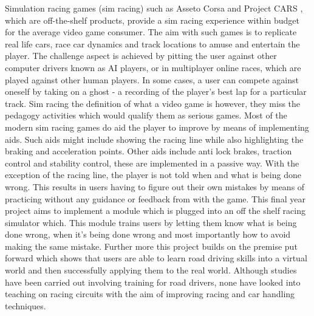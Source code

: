 Simulation racing games (sim racing) such as Asseto Corsa \cite{assestoCorsa} and Project CARS \cite{ProjectCars} , which are off-the-shelf products, provide a sim racing experience within budget for the average video game consumer. The aim with such games is to replicate real life cars, race car dynamics and track locations to amuse and entertain the player. The challenge aspect is achieved by pitting the user against other computer drivers known as AI players, or in multiplayer online races, which are played against other human players. In some cases, a user can compete against oneself by taking on a ghost - a recording of the player's best lap for a particular track. Sim racing the definition of what a video game is however, they miss the pedagogy activities which would qualify them as serious games. Most of the modern sim racing games do aid the player to improve by means of implementing aids. Such aids might include showing the racing line while also highlighting the braking and acceleration points. Other aids include anti lock brakes, traction control and stability control, these are implemented in a passive way. With the exception of the racing line, the player is not told when and what is being done wrong. This results in users having to figure out their own mistakes by means of practicing without any guidance or feedback from with the game. This final year project aims to implement a module which is plugged into an off the shelf racing simulator which. This module trains users by letting them know what is being done wrong, when it's being done wrong and most importantly how to avoid making the same mistake. Further more this project builds on the premise put forward which shows that users are able to learn road driving skills into a virtual world and then successfully applying them to the real world\cite{li2015can}\cite{vogel2006computer}. Although studies have been carried out involving training for road drivers, none have looked into teaching on racing circuits with the aim of improving racing and car handling techniques. 






